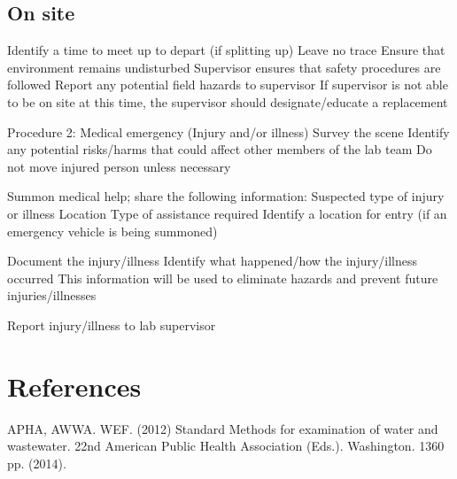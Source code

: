 \documentclass[12pt]{../SOP2}
\begin{document}
\subsection{On site}

Identify a time to meet up to depart (if splitting up)
Leave no trace
Ensure that environment remains undisturbed
Supervisor ensures that safety procedures are followed
Report any potential field hazards to supervisor
If supervisor is not able to be on site at this time, the supervisor should designate/educate a replacement

Procedure 2: Medical emergency (Injury and/or illness)
Survey the scene
Identify any potential risks/harms that could affect other members of the lab team
Do not move injured person unless necessary

Summon medical help; share the following information:
Suspected type of injury or illness
Location
Type of assistance required
Identify a location for entry (if an emergency vehicle is being summoned)

Document the injury/illness
Identify what happened/how the injury/illness occurred
This information will be used to eliminate hazards and prevent future injuries/illnesses

Report injury/illness to lab supervisor


\section{References}

\NP APHA, AWWA. WEF. (2012) Standard Methods for examination of water and wastewater. 22nd American Public Health Association (Eds.). Washington. 1360 pp. (2014).
\end{document}
